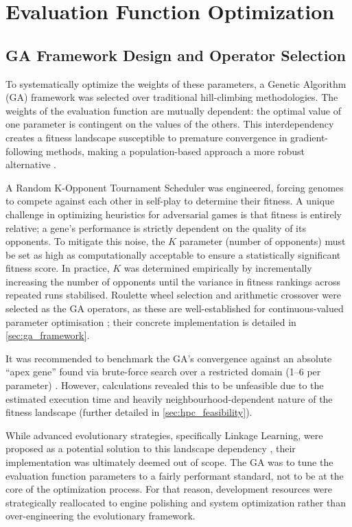 \section{Evaluation Function Optimization}

\subsection{GA Framework Design and Operator Selection}

To systematically optimize the weights of these parameters, a Genetic Algorithm (GA) framework was selected over traditional hill-climbing methodologies. The weights of the evaluation function are mutually dependent: the optimal value of one parameter is contingent on the values of the others. This interdependency creates a fitness landscape susceptible to premature convergence in gradient-following methods, making a population-based approach a more robust alternative \cite{goldberg1989genetic}.

A Random K-Opponent Tournament Scheduler was engineered, forcing genomes to compete against each other in self-play to determine their fitness. A unique challenge in optimizing heuristics for adversarial games is that fitness is entirely relative; a gene's performance is strictly dependent on the quality of its opponents. To mitigate this noise, the $K$ parameter (number of opponents) must be set as high as computationally acceptable to ensure a statistically significant fitness score. In practice, $K$ was determined empirically by incrementally increasing the number of opponents until the variance in fitness rankings across repeated runs stabilised. Roulette wheel selection and arithmetic crossover were selected as the GA operators, as these are well-established for continuous-valued parameter optimisation \cite{Katoch2021}; their concrete implementation is detailed in \cref{sec:ga_framework}.

It was recommended to benchmark the GA's convergence against an absolute ``apex gene'' found via brute-force search over a restricted domain (1--6 per parameter) \cite{assessor}. However, calculations revealed this to be unfeasible due to the estimated execution time and heavily neighbourhood-dependent nature of the fitness landscape (further detailed in \cref{sec:hpc_feasibility}).

While advanced evolutionary strategies, specifically Linkage Learning, were proposed as a potential solution to this landscape dependency \cite{assessor}, their implementation was ultimately deemed out of scope. The GA was to tune the evaluation function parameters to a fairly performant standard, not to be at the core of the optimization process. For that reason, development resources were strategically reallocated to engine polishing and system optimization rather than over-engineering the evolutionary framework.

